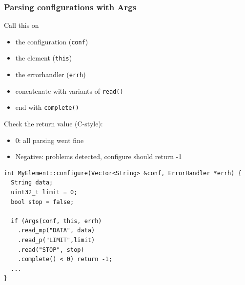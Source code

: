 \documentclass{beamer}
\begin{document}

%
%  

\begin{frame}
\frametitle{Parsing configurations with Args}
Call this on
\begin{itemize}
	\item the configuration (\verb!conf!)
	\item the element (\verb!this!) 
	\item the errorhandler (\verb!errh!)
	\item concatenate with variants of \verb!read()!
	\item end with \verb!complete()!
\end{itemize}
Check the return value (C-style):
\begin{itemize}
	\item 0: all parsing went fine
	\item Negative: problems detected, configure should return -1
\end{itemize}

\begin{lstlisting}
int MyElement::configure(Vector<String> &conf, ErrorHandler *errh) {
  String data;
  uint32_t limit = 0;
  bool stop = false;
  
  if (Args(conf, this, errh) 
    .read_mp("DATA", data) 
    .read_p("LIMIT",limit) 
    .read("STOP", stop)
    .complete() < 0) return -1;
  ...
}
\end{lstlisting}
\end{frame}
\end{document}
